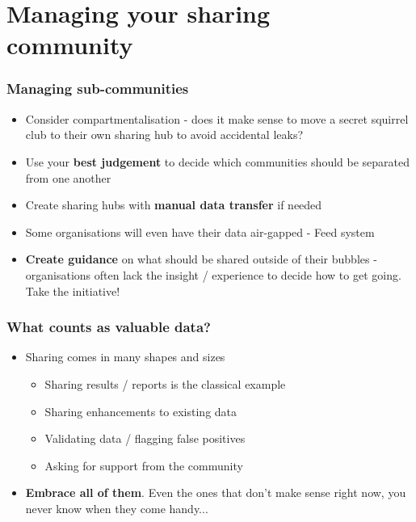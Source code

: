 \section{Managing your sharing \\ community}

\begin{frame}
	\frametitle{Managing sub-communities}
	\begin{itemize}
		\item Consider compartmentalisation - does it make sense to move a secret squirrel club to their own sharing hub to avoid accidental leaks?
		\item Use your \textbf{best judgement} to decide which communities should be separated from one another
		\item Create sharing hubs with \textbf{manual data transfer} if needed
		\item Some organisations will even have their data air-gapped - Feed system
		\item \textbf{Create guidance} on what should be shared outside of their bubbles - organisations often lack the insight / experience to decide how to get going. Take the initiative!
	\end{itemize}
\end{frame}

\begin{frame}
\frametitle{What counts as valuable data?}
\begin{itemize}
	\item Sharing comes in many shapes and sizes
	\begin{itemize}
		\item Sharing results / reports is the classical example
		\item Sharing enhancements to existing data
		\item Validating data / flagging false positives
		\item Asking for support from the community
	\end{itemize}
\item \textbf{Embrace all of them}. Even the ones that don't make sense right now, you never know when they come handy...
\end{itemize}
\end{frame}

